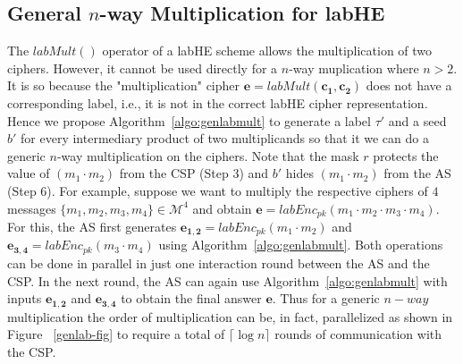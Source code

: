 \subsection{\textbf{General $n$-way Multiplication for \textsf{labHE}}}\label{genlab_appen}
The $labMult()$ operator of a \textsf{labHE} scheme allows the multiplication of two ciphers.
However, it cannot be used directly for a $n$-way muplication where $n>2$.  It is so because the "multiplication" cipher $\mathbf{e}=labMult(\mathbf{c_1},\mathbf{c_2})$ does not have  a corresponding label, i.e., it is not in the correct \textsf{labHE} cipher representation. Hence we propose Algorithm~\ref{algo:genlabmult} to generate a label $\tau'$ and a seed $b'$ for every intermediary product of two multiplicands so that it we can do a generic $n$-way multiplication on the ciphers. Note that the mask $r$ protects the value of $(m_1\cdot m_2)$ from the \textsf{CSP} (Step 3) and $b'$ hides $(m_1\cdot m_2)$ from the \textsf{AS} (Step 6). 
For example, suppose we want to multiply the respective ciphers of  $4$ messages $\{m_1,m_2,m_3,m_4\} \in \mathcal{M}^4$ and obtain $\mathbf{e}=labEnc_{pk}(m_1\cdot m_2\cdot m_3 \cdot m_4)$. For this, the \textsf{AS} first generates $\mathbf{e_{1,2}}=labEnc_{pk}(m_1\cdot m_2)$ and $\mathbf{e_{3,4}}=labEnc_{pk}(m_3\cdot m_4)$ using Algorithm~\ref{algo:genlabmult}. Both operations can be done in parallel in just one interaction round between the \textsf{AS} and the \textsf{CSP}. In the next round,  the \textsf{AS} can again use Algorithm~\ref{algo:genlabmult} with inputs $\mathbf{e_{1,2}}$ and $\mathbf{e_{3,4}}$ to obtain the final answer $\mathbf{e}$. %
Thus for a generic $n-way$ multiplication the order of multiplication can be, in fact, parallelized as  shown in Figure ~\ref{genlab-fig} to require a total of $\lceil \log n\rceil$ rounds of communication with the \textsf{CSP}.
